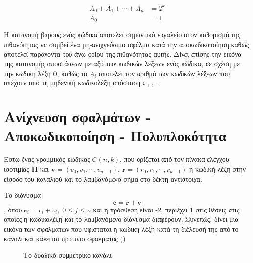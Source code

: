 \begin{equation}
\begin{aligned}
A_0+A_1+\cdots+A_n& = 2^k \\ 
Α_0 & =  1
\end{aligned}
\end{equation}

Η κατανομή βάρους ενός κώδικα αποτελεί σημαντικό εργαλείο στον καθορισμό της πιθανότητας να συμβεί ένα μη-ανιχνεύσιμο σφάλμα κατά την αποκωδικοποίηση καθώς αποτελεί παράγοντα του άνω ορίου της πιθανότητας αυτής. Δίνει επίσης την εικόνα της κατανομής αποστάσεων μεταξύ των κωδικών λέξεων ενός κώδικα, σε σχέση με την κωδική λέξη $\mathbf{0}$, καθώς το $A_i$ αποτελέι τον αριθμό των κωδικών λέξεων που απέχουν από τη μηδενική κωδικολέξη απόσταση $i$ \cite{ryan2009channel}, \cite{macwilliams1977theory}, \cite{peterson1972error}.

\section{Ανίχνευση σφαλμάτων - Αποκωδικοποίηση - Πολυπλοκότητα}

Έστω ένας γραμμικός  κώδικας $C(n,k)$, που ορίζεται από τον πίνακα ελέγχου ισοτιμίας $\mathbf{H}$ και $\mathbf{v}=\left(v_0, v_1,\cdots,v_{n-1}\right)$, $\mathbf{r}=\left(r_0, r_1,\cdots,r_{k-1}\right)$ η κωδική λέξη στην είσοδο του καναλιού και το λαμβανόμενο σήμα στο δέκτη αντίστοιχα.

Το διάνυσμα $$\mathbf{e}=\mathbf{r}+\mathbf{v}$$, όπου $e_i=r_i+v_i,\;0\leq j\leq n$ και η πρόσθεση είναι -2, περιέχει 1 στις θέσεις στις οποίες η κωδικολέξη και το λαμβανόμενο διάνυσμα διαφέρουν. Συνεπώς, δίνει μια εικόνα των σφαλμάτων που υφίσταται η κωδική λέξη κατά τη διέλευσή της από το  κανάλι και καλείται πρότυπο σφάλματος () 

\begin{figure}[h]
\caption{Το δυαδικό συμμετρικό κανάλι}
\label{fig:BSC channel}
\end{figure}

